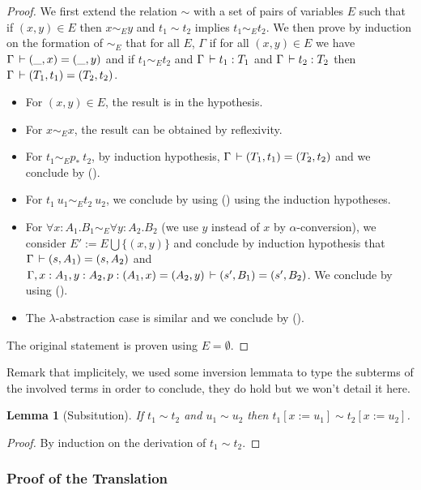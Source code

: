 \documentclass[11pt]{article}
\theoremstyle{plain}
\newtheorem{lemma}[theorem]{Lemma}
\theoremstyle{remark}
\begin{document}
\begin{proof}
  We first extend the relation $\sim$ with a set of pairs of variables $E$
  such that if $(x,y) \in E$ then $x \sim_E y$ and $t_1 \sim t_2$ implies
  $t_1 \sim_E t_2$.
  We then prove by induction on the formation of $\sim_E$ that for all $E$,
  $\Gamma$ if for all $(x,y) \in E$ we have $\Gamma \,\vdash (\_,x) = (\_,y)$ and if
  $t_1 \sim_E t_2$ and $\Gamma \,\vdash t_1 : T_1$ and $\Gamma \,\vdash t_2 : T_2$
  then $\Gamma \,\vdash (T_1,t_1) = (T_2,t_2)$.
  \begin{itemize}
    \item For $(x,y) \in E$, the result is in the hypothesis.
    \item For $x \sim_E x$, the result can be obtained by reflexivity.
    \item For $t_1 \sim_E p_*\ t_2$, by induction hypothesis,
          $\Gamma \,\vdash (T_1,t_1) = (T_2,t_2)$ and we conclude by
          ().
    \item For $t_1\ u_1 \sim_E t_2\ u_2$, we conclude by using
          () using the induction hypotheses.
    \item For $\forall x:A_1.B_1 \sim_E \forall y:A_2.B_2$ (we use $y$ instead
          of $x$ by $\alpha$-conversion), we consider
          $E' := E \bigcup \{ (x,y) \}$ and conclude by induction hypothesis
          that $\Gamma \,\vdash (s,A_1) = (s,A_2)$ and
          $\Gamma, x:A_1, y:A_2, p : (A_1,x) = (A_2,y) \,\vdash
          (s',B_1) = (s',B_2)$.
          We conclude by using ().
    \item The $\lambda$-abstraction case is similar and we conclude by
          ().
  \end{itemize}
  The original statement is proven using $E = \emptyset$.
\end{proof}
Remark that implicitely, we used some inversion lemmata to type the subterms
of the involved terms in order to conclude, they do hold but we won't detail it
here.

\begin{lemma}[Subsitution]
  \label{lem:subst}
  If $t_1 \sim t_2$ and $u_1 \sim u_2$ then $t_1[x := u_1] \sim t_2[x := u_2]$.
\end{lemma}

\begin{proof}
  By induction on the derivation of $t_1 \sim t_2$.
\end{proof}

\subsubsection{Proof of the Translation}
\end{document}
